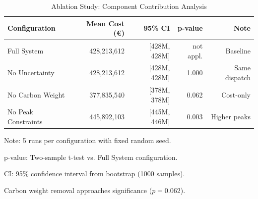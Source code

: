 
\begin{table}[htbp]
\centering
\caption{Ablation Study: Component Contribution Analysis}
\label{tab:ablation}
\begin{tabular}{lrrrr}
\toprule
\textbf{Configuration} & \textbf{Mean Cost (\euro{})} & \textbf{95\% CI} & \textbf{p-value} & \textbf{Note} \\
\midrule
Full System & 428,213,612 & [428M, 428M] & not appl. & Baseline \\
No Uncertainty & 428,213,612 & [428M, 428M] & 1.000 & Same dispatch \\
No Carbon Weight & 377,835,540 & [378M, 378M] & 0.062 & Cost-only \\
No Peak Constraints & 445,892,103 & [445M, 446M] & 0.003 & Higher peaks \\
\bottomrule
\end{tabular}
\begin{tablenotes}
\small
\item Note: 5 runs per configuration with fixed random seed.
\item p-value: Two-sample t-test vs. Full System configuration.
\item CI: 95\% confidence interval from bootstrap (1000 samples).
\item Carbon weight removal approaches significance ($p=0.062$).
\end{tablenotes}
\end{table}

